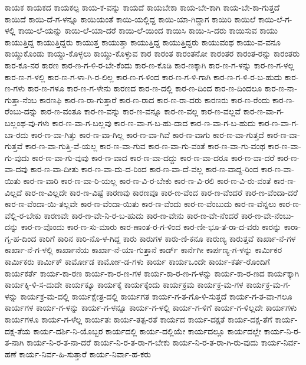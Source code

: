 {ಕಾಯಕ
ಕಾಯಕದ
ಕಾಯಕಲ್ಪ
ಕಾಯ-ಕ-ವನ್ನು
ಕಾಯದೆ
ಕಾಯಬೇಕಾ
ಕಾಯ-ಬೇ-ಕಾಗಿ
ಕಾಯ-ಬೇ-ಕಾ-ಗುತ್ತದೆ
ಕಾಯಿದೆ
ಕಾಯಿ-ದೆ-ಗ-ಳನ್ನೂ
ಕಾಯಿಯಂತೆ
ಕಾಯಿ-ಯಲ್ಲಿದ್ದ
ಕಾಯಿ-ಯಾ-ಗಿದ್ದಾಗ
ಕಾಯಿರಿ
ಕಾಯಿಲೆ
ಕಾಯಿ-ಲೆ-ಗ-ಳಲ್ಲಿ
ಕಾಯಿ-ಲೆ-ಯನ್ನು
ಕಾಯಿ-ಲೆ-ಯಾ-ದರೆ
ಕಾಯಿ-ಲೆ-ಯಿಂದ
ಕಾಯಿಸಿ
ಕಾಯಿ-ಸಿ-ದರು
ಕಾಯಿಸುವ
ಕಾಯು
ಕಾಯುತ್ತಿದ್ದ
ಕಾಯುತ್ತಿದ್ದರು
ಕಾಯುತ್ತ
ಕಾಯುತ್ತಾ
ಕಾಯುತ್ತಿದ್ದ
ಕಾಯುತ್ತಿದ್ದರು
ಕಾಯುವಂಥ
ಕಾಯು-ವ-ವನೂ
ಕಾಯ್ದುಕೊಂಡು
ಕಾಯ್ದು-ಕೊಳ್ಳಲು
ಕಾಯ್ದು-ಕೊಳ್ಳುವ
ಕಾರ
ಕಾರಂತ
ಕಾರಂತನೋ
ಕಾರಂತರ
ಕಾರಂತ-ರನ್ನು
ಕಾರಂತರು
ಕಾರ-ಕೂ-ನರ
ಕಾರಣ
ಕಾರ-ಣ-ಗ-ಳಿ-ರ-ಬೇ-ಕೆಂದು
ಕಾರ-ಣ-ಕೊಡಿ
ಕಾರ-ಣಕ್ಕಾಗಿ
ಕಾರ-ಣ-ಗ-ಳನ್ನು
ಕಾರ-ಣ-ಗ-ಳಲ್ಲ
ಕಾರ-ಣ-ಗ-ಳಲ್ಲಿ
ಕಾರ-ಣ-ಗ-ಳಾ-ಗಿ-ರ-ಲಿಲ್ಲ
ಕಾರ-ಣ-ಗ-ಳಿಂದ
ಕಾರ-ಣ-ಗ-ಳಿ-ಗಾಗಿ
ಕಾರ-ಣ-ಗ-ಳಿ-ರ-ಬ-ಹುದು
ಕಾರ-ಣ-ಗಳು
ಕಾರ-ಣ-ಗಳೂ
ಕಾರ-ಣ-ಗ-ಳೇನು
ಕಾರಣದ
ಕಾರ-ಣ-ದಲ್ಲಿ
ಕಾರ-ಣ-ದಿಂದ
ಕಾರ-ಣ-ದಿಂದಲೂ
ಕಾರ-ಣ-ನಾ-ಗುತ್ತಾ-ನೆಂಬ
ಕಾರಣಫಿ
ಕಾರ-ಣ-ರಾ-ಗುತ್ತಾರೆ
ಕಾರ-ಣ-ರಾದ
ಕಾರ-ಣ-ರಾ-ದರು
ಕಾರಣರು
ಕಾರ-ಣ-ರೆಂದು
ಕಾರ-ಣ-ರೆಂಬು-ದನ್ನು
ಕಾರ-ಣ-ವಂತೂ
ಕಾರ-ಣ-ವನ್ನು
ಕಾರ-ಣ-ವನ್ನೂ
ಕಾರ-ಣ-ವಲ್ಲ
ಕಾರ-ಣ-ವಲ್ಲವೆ
ಕಾರ-ಣ-ವಾ-ಗ-ಬಲ್ಲಂಥ-ವು-ಗಳು
ಕಾರ-ಣ-ವಾ-ಗ-ಬಲ್ಲವು
ಕಾರ-ಣ-ವಾ-ಗ-ಬ-ಹು-ದಾದ
ಕಾರ-ಣ-ವಾ-ಗ-ಬ-ಹುದು
ಕಾರ-ಣ-ವಾ-ಗ-ಬಾ-ರದು
ಕಾರ-ಣ-ವಾ-ಗಿತ್ತು
ಕಾರ-ಣ-ವಾ-ಗಿಲ್ಲ
ಕಾರ-ಣ-ವಾ-ಗಿವೆ
ಕಾರ-ಣ-ವಾಗು
ಕಾರ-ಣ-ವಾ-ಗುತ್ತದೆ
ಕಾರ-ಣ-ವಾ-ಗುತ್ತವೆ
ಕಾರ-ಣ-ವಾ-ಗುತ್ತಿ-ವೆ-ಯಲ್ಲ
ಕಾರ-ಣ-ವಾ-ಗುವ
ಕಾರ-ಣ-ವಾ-ಗು-ವಂತೆ
ಕಾರ-ಣ-ವಾ-ಗು-ವಂಥ
ಕಾರ-ಣ-ವಾ-ಗು-ವುದು
ಕಾರ-ಣ-ವಾ-ಗು-ವುವು
ಕಾರ-ಣ-ವಾದ
ಕಾರ-ಣ-ವಾ-ದದ್ದು
ಕಾರ-ಣ-ವಾ-ದರೂ
ಕಾರ-ಣ-ವಾ-ದರೆ
ಕಾರ-ಣ-ವಾ-ದವು
ಕಾರ-ಣ-ವಾ-ದೀತು
ಕಾರ-ಣ-ವಾ-ದು-ದ-ರಿಂದ
ಕಾರ-ಣ-ವಾ-ದೆ-ವಲ್ಲ
ಕಾರ-ಣ-ವಾದ್ದ-ರಿಂದ
ಕಾರ-ಣ-ವಾ-ಯಿತು
ಕಾರ-ಣ-ವಾರಿ
ಕಾರ-ಣ-ವಾ-ರಿ-ಯಲ್ಲ
ಕಾರ-ಣ-ವಿ-ರ-ಬೇಕು
ಕಾರ-ಣ-ವಿ-ರಲಿ
ಕಾರ-ಣ-ವಿ-ರು-ವಂತೆ
ಕಾರ-ಣ-ವಿಲ್ಲದೆ
ಕಾರ-ಣ-ವಿಲ್ಲದೇ
ಕಾರ-ಣ-ವಿಷ್ಟೆ
ಕಾರಣವು
ಕಾರಣವೂ
ಕಾರ-ಣ-ವೆಂದ
ಕಾರ-ಣ-ವೆಂದರೆ
ಕಾರ-ಣ-ವೆಂದಾ-ದರೆ
ಕಾರ-ಣ-ವೆಂದಾ-ಯಿ-ತಲ್ಲವೇ
ಕಾರ-ಣ-ವೆಂದಾ-ಯಿತು
ಕಾರ-ಣ-ವೆಂದು
ಕಾರ-ಣ-ವೆಂಬುದು
ಕಾರ-ಣ-ವೆನ್ನಲು
ಕಾರ-ಣ-ವೆಲ್ಲಿ-ರ-ಬೇಕು
ಕಾರಣವೇ
ಕಾರ-ಣ-ವೇ-ನಿ-ರ-ಬ-ಹುದು
ಕಾರ-ಣ-ವೇನು
ಕಾರ-ಣ-ವೇ-ನೆಂದರೆ
ಕಾರ-ಣ-ವೇ-ನೆಂಬು-ದನ್ನು
ಕಾರ-ಣ-ವೊಂದು
ಕಾರ-ಣ-ಸು-ಮಾರು
ಕಾರ-ಣಾಂತ-ರ-ಗ-ಳಿಂದ
ಕಾರ-ಣೀ-ಭೂ-ತ-ರಾ-ದ-ವರು
ಕಾರನ್ನು
ಕಾರಾ-ಗೃ-ಹ-ದಿಂದ
ಕಾರಿಗೆ
ಕಾರಿನ
ಕಾರಿ-ನೊ-ಳ-ಗಿದ್ದ
ಕಾರು
ಕಾರುಗಳ
ಕಾರು-ಣಿ-ಕನೂ
ಕಾರುಣ್ಯ
ಕಾರುತ್ತವೆ
ಕಾರ್ಖಾ-ನೆ-ಗಳ
ಕಾರ್ಖಾ-ನೆ-ಗ-ಳಲ್ಲಿ
ಕಾರ್ಖಾನೆಯ
ಕಾರ್ಖಾ-ನೆ-ಯಾ-ಗುತ್ತಾನೆ
ಕಾರ್ಡ್
ಕಾರ್ನೆಗೀ
ಕಾರ್ಪಣ್ಯ-ಗ-ಳನ್ನು
ಕಾರ್ಮಿಕರ
ಕಾರ್ಮಿಕರು
ಕಾರ್ಮಿಕ್
ಕಾರ್ಮೋಡ
ಕಾರ್ಮೋ-ಡ-ಗಳು
ಕಾರ್ಯ
ಕಾರ್ಯಒಂದೇ
ಕಾರ್ಯ-ಕರ್ತ-ರೊಂದಿಗೆ
ಕಾರ್ಯಕರ್ತೆ
ಕಾರ್ಯ-ಕಾ-ರಣ
ಕಾರ್ಯ-ಕಾ-ರ-ಣ-ಗಳ
ಕಾರ್ಯ-ಕಾ-ರ-ಣ-ಗ-ಳನ್ನು
ಕಾರ್ಯ-ಕಾ-ರ-ಣದ
ಕಾರ್ಯಕ್ಕಾಗಿ
ಕಾರ್ಯಕ್ಕಿ-ಳಿ-ಸ-ದುದೇ
ಕಾರ್ಯಕ್ಕೂ
ಕಾರ್ಯಕ್ಕೆ
ಕಾರ್ಯಕ್ಕೆಂದು
ಕಾರ್ಯಕ್ರಮ
ಕಾರ್ಯಕ್ರ-ಮ-ಗಳ
ಕಾರ್ಯಕ್ರ-ಮ-ಗ-ಳನ್ನು
ಕಾರ್ಯಕ್ರ-ಮ-ದಲ್ಲಿ
ಕಾರ್ಯಕ್ಷೇತ್ರ-ದಲ್ಲಿ
ಕಾರ್ಯಗತ
ಕಾರ್ಯ-ಗ-ತ-ಗೊ-ಳಿ-ಸುತ್ತದೆ
ಕಾರ್ಯ-ಗ-ತ-ವಾ-ಗಲೂ
ಕಾರ್ಯಗಳ
ಕಾರ್ಯ-ಗ-ಳನ್ನು
ಕಾರ್ಯ-ಗ-ಳನ್ನೂ
ಕಾರ್ಯ-ಗ-ಳಲ್ಲಿ
ಕಾರ್ಯ-ಗ-ಳಿಗೆ
ಕಾರ್ಯ-ಗ-ಳಿಲ್ಲದೇ
ಕಾರ್ಯಗಳು
ಕಾರ್ಯಗಳೂ
ಕಾರ್ಯ-ಗ-ಳೆಲ್ಲ
ಕಾರ್ಯತಃ
ಕಾರ್ಯ-ತತ್ಪ-ರತೆ
ಕಾರ್ಯದ
ಕಾರ್ಯ-ದಕ್ಷತೆ
ಕಾರ್ಯ-ದಕ್ಷ-ತೆಗೆ
ಕಾರ್ಯ-ದಕ್ಷ-ತೆಯ
ಕಾರ್ಯ-ದರ್ಶಿ-ನಿ-ಯೊಬ್ಬರ
ಕಾರ್ಯದಲ್ಲಿ
ಕಾರ್ಯ-ದಲ್ಲಿಯೇ
ಕಾರ್ಯದಲ್ಲೂ
ಕಾರ್ಯದಲ್ಲೇ
ಕಾರ್ಯ-ನಿ-ರ-ತ-ನಾಗಿ
ಕಾರ್ಯ-ನಿ-ರ-ತ-ನಾ-ದರೆ
ಕಾರ್ಯ-ನಿ-ರ-ತ-ರಾ-ಗ-ಬೇಕು
ಕಾರ್ಯ-ನಿ-ರ-ತ-ರಾ-ಗಿ-ರು-ವುದು
ಕಾರ್ಯ-ನಿರ್ವ-ಹಣೆ
ಕಾರ್ಯ-ನಿರ್ವ-ಹಿ-ಸುತ್ತಾರೆ
ಕಾರ್ಯ-ನಿರ್ವಾ-ಹ-ಕರು
}
